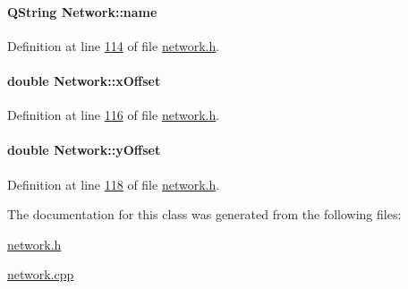 \hypertarget{class_network_ab6643733a517f930c60b06f5ffd78186}{}
\paragraph[{name}]{\setlength{\rightskip}{0pt plus 5cm}Q\+String Network\+::name}\label{class_network_ab6643733a517f930c60b06f5ffd78186}


Definition at line \hyperlink{network_8h_source_l00114}{114} of file \hyperlink{network_8h_source}{network.\+h}.

\hypertarget{class_network_a9f5c70be28a45320802bd0ac3947d114}{}
\paragraph[{x\+Offset}]{\setlength{\rightskip}{0pt plus 5cm}double Network\+::x\+Offset}\label{class_network_a9f5c70be28a45320802bd0ac3947d114}


Definition at line \hyperlink{network_8h_source_l00116}{116} of file \hyperlink{network_8h_source}{network.\+h}.

\hypertarget{class_network_a771b16f7eb4459d0ca7141c048b1ab59}{}
\paragraph[{y\+Offset}]{\setlength{\rightskip}{0pt plus 5cm}double Network\+::y\+Offset}\label{class_network_a771b16f7eb4459d0ca7141c048b1ab59}


Definition at line \hyperlink{network_8h_source_l00118}{118} of file \hyperlink{network_8h_source}{network.\+h}.



The documentation for this class was generated from the following files\+:\begin{DoxyCompactItemize}
\item 
\hyperlink{network_8h}{network.\+h}\item 
\hyperlink{network_8cpp}{network.\+cpp}\end{DoxyCompactItemize}
